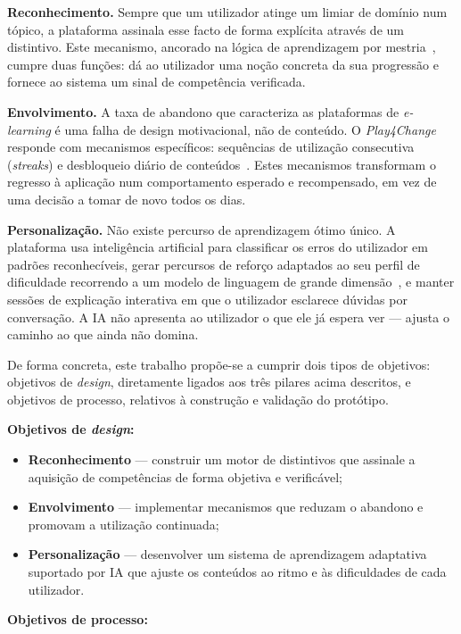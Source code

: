 \textbf{Reconhecimento.} Sempre que um utilizador atinge um limiar de domínio num tópico, a plataforma assinala esse facto de forma explícita através de um distintivo. Este mecanismo, ancorado na lógica de aprendizagem por mestria~\cite{bloom1968learning}, cumpre duas funções: dá ao utilizador uma noção concreta da sua progressão e fornece ao sistema um sinal de competência verificada.

\textbf{Envolvimento.} A taxa de abandono que caracteriza as plataformas de \emph{e-learning} é uma falha de design motivacional, não de conteúdo. O \emph{Play4Change} responde com mecanismos específicos: sequências de utilização consecutiva (\emph{streaks}) e desbloqueio diário de conteúdos~\cite{ott2019gamification}. Estes mecanismos transformam o regresso à aplicação num comportamento esperado e recompensado, em vez de uma decisão a tomar de novo todos os dias.

\textbf{Personalização.} Não existe percurso de aprendizagem ótimo único. A plataforma usa inteligência artificial para classificar os erros do utilizador em padrões reconhecíveis, gerar percursos de reforço adaptados ao seu perfil de dificuldade recorrendo a um modelo de linguagem de grande dimensão~\cite{kasneci2023chatgpt}, e manter sessões de explicação interativa em que o utilizador esclarece dúvidas por conversação. A IA não apresenta ao utilizador o que ele já espera ver --- ajusta o caminho ao que ainda não domina.

De forma concreta, este trabalho propõe-se a cumprir dois tipos de objetivos: objetivos de \emph{design}, diretamente ligados aos três pilares acima descritos, e objetivos de processo, relativos à construção e validação do protótipo.

\noindent\textbf{Objetivos de \emph{design}:}

\begin{itemize}
	\item \textbf{Reconhecimento} --- construir um motor de distintivos que assinale a aquisição de competências de forma objetiva e verificável;
	\item \textbf{Envolvimento} --- implementar mecanismos que reduzam o abandono e promovam a utilização continuada;
	\item \textbf{Personalização} --- desenvolver um sistema de aprendizagem adaptativa suportado por IA que ajuste os conteúdos ao ritmo e às dificuldades de cada utilizador.
\end{itemize}

\noindent\textbf{Objetivos de processo:}

